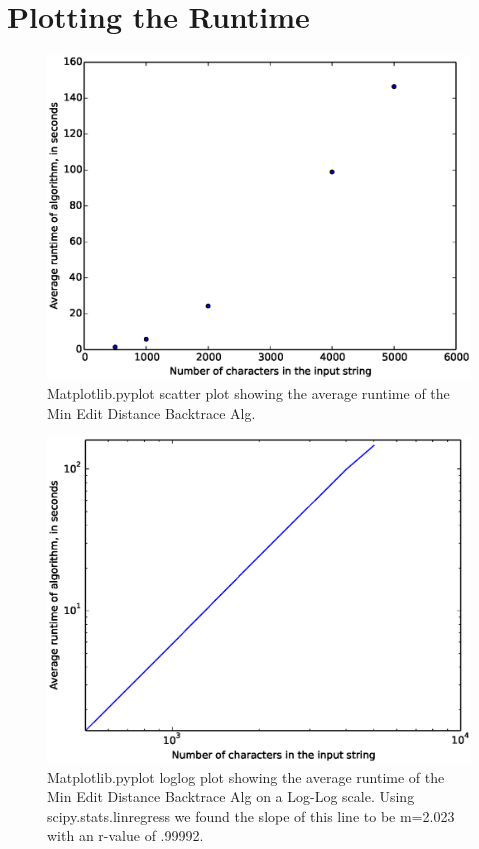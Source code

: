 \documentclass[10pt, onecolumn, draftclsnofoot, letterpaper, compsoc]{IEEEtran}
\begin{document}
\section{Plotting the Runtime}

\begin{figure}[H]
    \centering
    \includegraphics[width=\textwidth]{scatter_graph.eps}
    \caption{Matplotlib.pyplot scatter plot showing the average runtime of the Min Edit Distance Backtrace Alg.}
\end{figure}

\begin{figure}[H]
    \centering
    \includegraphics[width=\textwidth]{loglog_graph.eps}
    \caption{Matplotlib.pyplot loglog plot showing the average runtime of the Min Edit Distance Backtrace Alg on a Log-Log scale.
				Using scipy.stats.linregress we found the slope of this line to be m=2.023 with an r-value of .99992.}
\end{figure}
\end{document}
